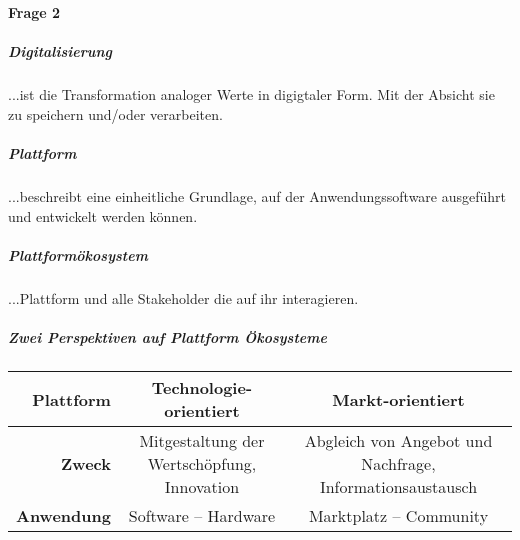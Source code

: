 \documentclass[a4paper]{article}
\begin{document}
\part*{}
\hrulefill

\subsection*{Frage 2}
\label{le2-2}
\subsubsection*{Digitalisierung}
...ist die Transformation analoger Werte in digigtaler Form. Mit der Absicht sie zu speichern und/oder verarbeiten.

\subsubsection*{Plattform}
...beschreibt eine einheitliche Grundlage, auf der Anwendungssoftware ausgeführt und entwickelt werden können.

\subsubsection*{Plattformökosystem}
...Plattform und alle Stakeholder die auf ihr interagieren. \\
\hrulefill

\subsubsection*{Zwei Perspektiven auf Plattform Ökosysteme}

\begin{adjustbox}{max width=\linewidth}
	\begin{tabular}{|r|c|c|}
		\hline
		\textbf{Plattform} & \textbf{Technologie-orientiert} & \textbf{Markt-orientiert} \\
		\hline
		\textbf{Zweck} & Mitgestaltung der Wertschöpfung, Innovation & Abgleich von Angebot und Nachfrage, Informationsaustausch  \\
		\hline
		\textbf{Anwendung} & Software -- Hardware & Marktplatz -- Community \\
		\hline
	\end{tabular}
\end{adjustbox}
\end{document}
